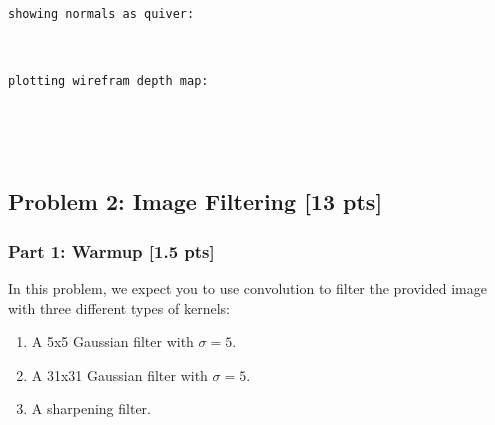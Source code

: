 \documentclass[11pt]{article}
\providecommand{\tightlist}{%
      \setlength{\itemsep}{0pt}\setlength{\parskip}{0pt}}
\begin{document}
    \begin{Verbatim}[commandchars=\\\{\}]
showing normals as quiver:
\end{Verbatim}

    \begin{center}
    \end{center}
    { \hspace*{\fill} \\}
    
    \begin{Verbatim}[commandchars=\\\{\}]
plotting wirefram depth map:
\end{Verbatim}

    \begin{center}
    \end{center}
    { \hspace*{\fill} \\}
    
    \begin{center}
    \end{center}
    { \hspace*{\fill} \\}
    
    \hypertarget{problem-2-image-filtering-13-pts}{%
\subsection{Problem 2: Image Filtering {[}13
pts{]}}\label{problem-2-image-filtering-13-pts}}

\hypertarget{part-1-warmup-1.5-pts}{%
\subsubsection{Part 1: Warmup {[}1.5
pts{]}}\label{part-1-warmup-1.5-pts}}

In this problem, we expect you to use convolution to filter the provided
image with three different types of kernels:

\begin{enumerate}
\def\labelenumi{\arabic{enumi}.}
\tightlist
\item
  A 5x5 Gaussian filter with \(\sigma = 5\).
\item
  A 31x31 Gaussian filter with \(\sigma = 5\).
\item
  A sharpening filter.
\end{enumerate}
\end{document}
